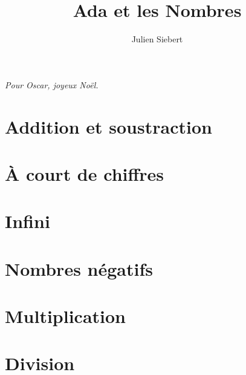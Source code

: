 \documentclass[a5paper,11pt,onecolumn]{book}
\title{Ada et les Nombres}
\author{Julien Siebert}
\begin{document}
\maketitle
\textit{Pour Oscar, joyeux Noël.}
\chapter{}

\chapter{Addition et soustraction}

\chapter{À court de chiffres}

\chapter{Infini}

\chapter{Nombres négatifs}

\chapter{Multiplication}

\chapter{Division}

\end{document}

